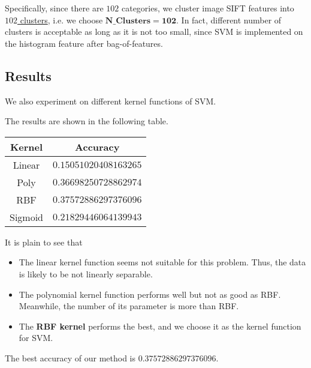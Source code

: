 \documentclass{article}
\begin{document}
\hspace{0.6em}
Specifically, since there are $102$ categories, we cluster image SIFT features into \underline{$102$ clusters}, i.e. we choose $\boldsymbol{N\_Clusters=102}$. In fact, different number of clusters is acceptable as long as it is not too small, since SVM is implemented on the histogram feature after bag-of-features.

\subsection{Results}

We also experiment on different kernel functions of SVM. 

\hspace{-1.8em}
The results are shown in the following table.

\begin{table}[htbp]
    \centering
    \begin{tabular}{c|c}
        \hline
        Kernel & Accuracy \\
        \hline
        Linear & $0.15051020408163265$ \\
        Poly & $0.36698250728862974$ \\
        RBF & $\boldsymbol{0.37572886297376096}$ \\
        Sigmoid & $0.21829446064139943$ \\
        \hline
    \end{tabular}
\end{table}

\hspace{-1.8em}
It is plain to see that 

\begin{itemize}
    \item The linear kernel function seems not suitable for this problem. Thus, the data is likely to be not linearly separable.
    \item The polynomial kernel function performs well but not as good as RBF. Meanwhile, the number of its parameter is more than RBF.
    \item The \textbf{RBF kernel} performs the best, and we choose it as the kernel function for SVM.
\end{itemize}

\hspace{-1.8em}
The best accuracy of our method is $0.37572886297376096$.
\end{document}
